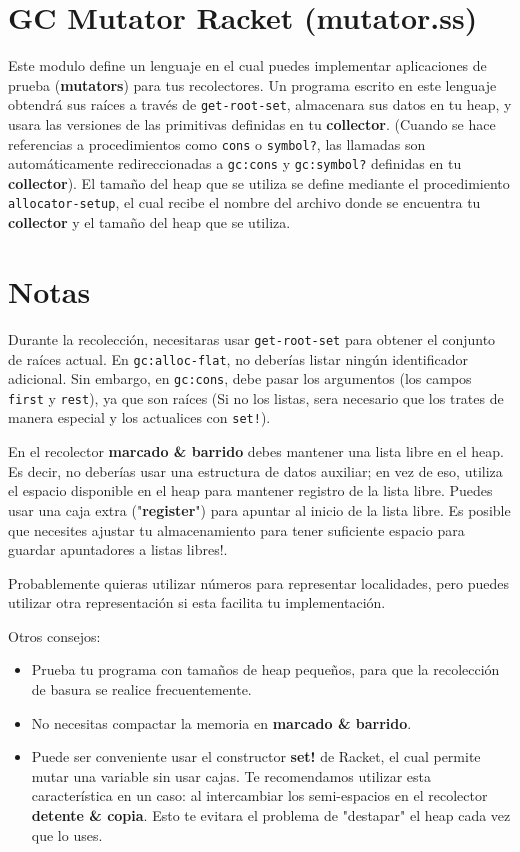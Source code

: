 \documentclass{article}
\begin{document}
\section*{GC Mutator Racket (mutator.ss)}
Este modulo define un lenguaje en el cual puedes implementar aplicaciones de prueba (\textbf{mutators}) para
tus recolectores. Un programa escrito en este lenguaje obtendrá sus raíces a través de \verb;get-root-set;,
almacenara sus datos en tu heap, y usara las versiones de las primitivas definidas en tu \textbf{collector}.
(Cuando se hace referencias a procedimientos como \verb;cons; o \verb;symbol?;, las llamadas son automáticamente
redireccionadas a \verb;gc:cons; y \verb;gc:symbol?; definidas en tu \textbf{collector}).
El tamaño del heap que se utiliza se define mediante el procedimiento \verb;allocator-setup;, el cual recibe
el nombre del archivo donde se encuentra tu \textbf{collector} y el tamaño del heap que se utiliza.

\section*{Notas}
Durante la recolección, necesitaras usar \verb;get-root-set; para obtener el conjunto de raíces actual. En
\verb;gc:alloc-flat;, no deberías listar ningún identificador adicional. Sin embargo, en \verb;gc:cons;, debe
pasar los argumentos (los campos \verb;first; y \verb;rest;), ya que son raíces (Si no los listas, sera necesario
que los trates de manera especial y los actualices con \verb;set!;).

En el recolector \textbf{marcado \& barrido} debes mantener una lista libre en el heap. Es decir, no deberías
usar una estructura de datos auxiliar; en vez de eso, utiliza el espacio disponible en el heap para mantener
registro de la lista libre. Puedes usar una caja extra ("\textbf{register}") para apuntar al inicio de la lista
libre. Es posible que necesites ajustar tu almacenamiento para tener suficiente espacio para guardar apuntadores
a listas libres!.

Probablemente quieras utilizar números para representar localidades, pero puedes utilizar otra representación
si esta facilita tu implementación.

Otros consejos:
\begin{itemize}
\item Prueba tu programa con tamaños de heap pequeños, para que la recolección de basura se realice
  frecuentemente.
\item No necesitas compactar la memoria en \textbf{marcado \& barrido}.
\item Puede ser conveniente usar el constructor \textbf{set!} de Racket, el cual permite mutar una variable
  sin usar cajas. Te recomendamos utilizar esta característica en un caso: al intercambiar los semi-espacios
  en el recolector \textbf{detente \& copia}. Esto te evitara el problema de "destapar" el heap cada vez que lo
  uses.
\end{itemize}
\end{document}
